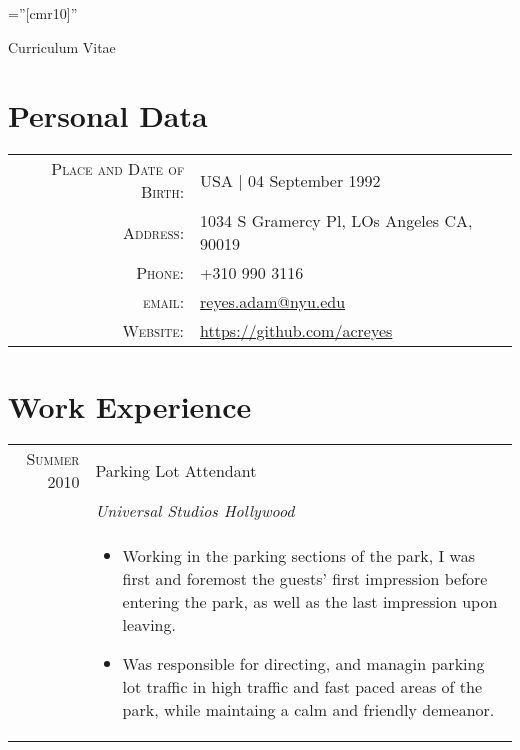 \documentclass[a4paper,10pt]{article} %
\begin{document}
\font\fb=''[cmr10]'' %

\par{\centering\Large Curriculum Vitae\par}
\par{\bigskip\par} %

\section{Personal Data}

\begin{tabular}{rl}
\textsc{Place and Date of Birth:} & USA  | 04 September 1992 \\
\textsc{Address:} & 1034 S Gramercy Pl, LOs Angeles CA, 90019\\
\textsc{Phone:} & +310 990 3116\\
\textsc{email:} & \href{mailto:reyes.adam@nyu.edu}{reyes.adam@nyu.edu}\\
\textsc{Website:} & \url{https://github.com/acreyes}
\end{tabular}


\section{Work Experience}

\begin{tabular}{r|p{11cm}}
  \textsc{Summer 2010} & Parking Lot Attendant \\
  & \emph{Universal Studios Hollywood}\\
  &
  \begin{itemize}
  \item Working in the parking sections of the park, I was first and foremost the guests' first impression before entering the park, as well as the last impression upon leaving.
  \item Was responsible for directing, and managin parking lot traffic in high traffic and fast paced areas of the park, while maintaing a calm and friendly demeanor.
  \end{itemize}

\end{tabular}
\end{document}
